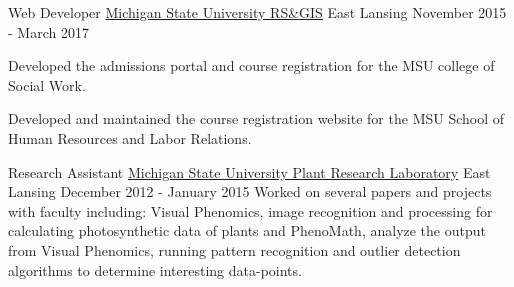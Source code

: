 \begin{cventries}
  \cventry
    {Web Developer}
    {\href{http://www.rsgis.msu.edu}{Michigan State University RS\&GIS}}
    {East Lansing}
    {November 2015 - March 2017}
    {
      \begin{cvitems}
        \item {Developed the admissions portal and course registration for the MSU college of Social Work.}
        \item {Developed and maintained the course registration website for the MSU School of Human Resources and Labor Relations.}
      \end{cvitems}
    }

  \cventry
    {Research Assistant}
    {\href{https://prl.natsci.msu.edu/research-tech/center-for-advanced-algal-and-plant-phenotyping}{Michigan State University Plant Research Laboratory}}
    {East Lansing}
    {December 2012 - January 2015}
    {
      {Worked on several papers and projects with faculty including: Visual Phenomics, image recognition
      and processing for calculating photosynthetic data of plants and PhenoMath, analyze the output from Visual Phenomics,
      running pattern recognition and outlier detection algorithms to determine interesting data-points. }
    }
\end{cventries}
